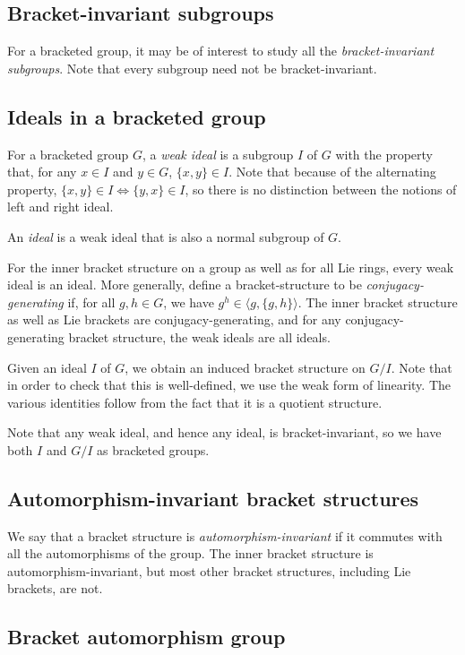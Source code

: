 \documentclass[10pt]{amsart}
\begin{document}
\subsection{Bracket-invariant subgroups}

For a bracketed group, it may be of interest to study all the {\em
bracket-invariant subgroups}. Note that every subgroup need not be
bracket-invariant.

\subsection{Ideals in a bracketed group}

For a bracketed group $G$, a {\em weak ideal} is a subgroup $I$ of $G$
with the property that, for any $x \in I$ and $y \in G$, $\{ x,y \} \in
I$. Note that because of the alternating property, $\{ x,y \} \in I \iff \{ y
, x \} \in I$, so there is no distinction between the notions of left and
right ideal.

An {\em ideal} is a weak ideal that is also a normal subgroup of $G$.

For the inner bracket structure on a group as well as for all Lie
rings, every weak ideal is an ideal. More generally, define a
bracket-structure to be {\em conjugacy-generating} if, for all $g,h
\in G$, we have $g^h \in \langle g, \{ g,h \} \rangle$. The inner
bracket structure as well as Lie brackets are conjugacy-generating,
and for any conjugacy-generating bracket structure, the weak ideals
are all ideals.

Given an ideal $I$ of $G$, we obtain an induced bracket structure on
$G/I$. Note that in order to check that this is well-defined, we use
the weak form of linearity. The various identities follow from the fact
that it is a quotient structure.

Note that any weak ideal, and hence any ideal, is bracket-invariant,
so we have both $I$ and $G/I$ as bracketed groups.
\subsection{Automorphism-invariant bracket structures}

We say that a bracket structure is {\em automorphism-invariant} if it
commutes with all the automorphisms of the group. The inner bracket
structure is automorphism-invariant, but most other bracket
structures, including Lie brackets, are not.

\subsection{Bracket automorphism group}
\end{document}

